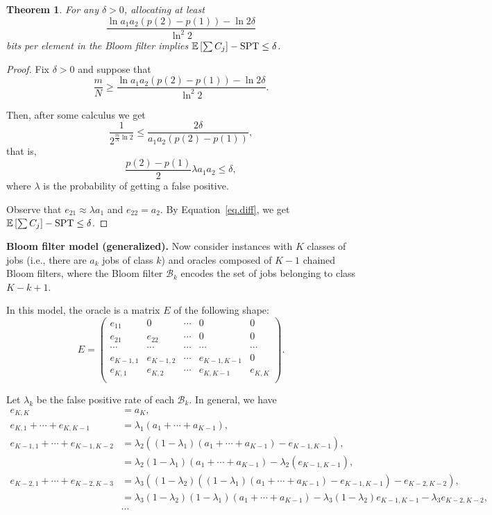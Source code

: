 \documentclass{article}
\newtheorem{theorem}{Theorem}
\begin{document}
\begin{theorem}
    For any \(\delta>0\), allocating at least
    \[
        \frac{\ln a_1a_2(p(2)-p(1))-\ln 2\delta}{\ln^2 2}
    \]
    bits per element in the Bloom filter implies \(\mathbb{E}\left[\sum C_j\right]-\text{SPT}\le\delta\).
\end{theorem}
\begin{proof}
    Fix \(\delta>0\) and suppose that
    \[
        \frac{m}{N}\ge\frac{\ln a_1a_2(p(2)-p(1))-\ln 2\delta}{\ln^2 2}.
    \]

    Then, after some calculus we get
    \[
        \frac{1}{2^{\frac{m}{N}\ln 2}}\le\frac{2\delta}{a_1a_2(p(2)-p(1))},
    \]
    that is,
    \[
        \frac{p(2)-p(1)}{2}\lambda a_1a_2\le\delta,
    \]
    where \(\lambda\) is the probability of getting a false positive.

    Observe that \(e_{21}\approx\lambda a_1\) and \(e_{22}=a_2\).
    By Equation~\ref{eq.diff}, we get \(\mathbb{E}\left[\sum C_j\right]-\text{SPT}\le\delta\).
\end{proof}

\noindent\textbf{Bloom filter model (generalized).}
Now consider instances with \(K\) classes of jobs (i.e., there are \(a_k\) jobs of class \(k\)) and oracles composed of \(K-1\) chained Bloom filters, where the Bloom filter \(\mathcal{B}_k\) encodes the set of jobs belonging to class \(K-k+1\).

In this model, the oracle is a matrix \(E\) of the following shape:
\[
    E=\begin{pmatrix}
        e_{11} & 0      & \cdots & 0 & 0 \\
        e_{21} & e_{22} & \cdots & 0 & 0 \\
        \cdots & \cdots & \cdots & \cdots & \cdots \\
        e_{K-1,1} & e_{K-1,2} & \cdots & e_{K-1,K-1} & 0 \\
        e_{K,1}   & e_{K,2}   & \cdots & e_{K,K-1}   & e_{K,K} \\
    \end{pmatrix}.
\]

Let \(\lambda_k\) be the false positive rate of each \(\mathcal{B}_k\).
In general, we have
\begin{align*}
    e_{K,K}&=a_K, \\
    e_{K,1}+\cdots+e_{K,K-1}&=\lambda_1(a_1+\cdots+a_{K-1}), \\
    e_{K-1,1}+\cdots+e_{K-1,K-2}&=\lambda_2((1-\lambda_1)(a_1+\cdots+a_{K-1})-e_{K-1,K-1}), \\
    &=\lambda_2(1-\lambda_1)(a_1+\cdots+a_{K-1})-\lambda_2(e_{K-1,K-1}), \\
    e_{K-2,1}+\cdots+e_{K-2,K-3}&=\lambda_3((1-\lambda_2)((1-\lambda_1)(a_1+\cdots+a_{K-1})-e_{K-1,K-1})-e_{K-2,K-2}), \\
    &=\lambda_3(1-\lambda_2)(1-\lambda_1)(a_1+\cdots+a_{K-1})-\lambda_3(1-\lambda_2)e_{K-1,K-1}-\lambda_3e_{K-2,K-2}, \\
    &\cdots \\
\end{align*}
\end{document}
